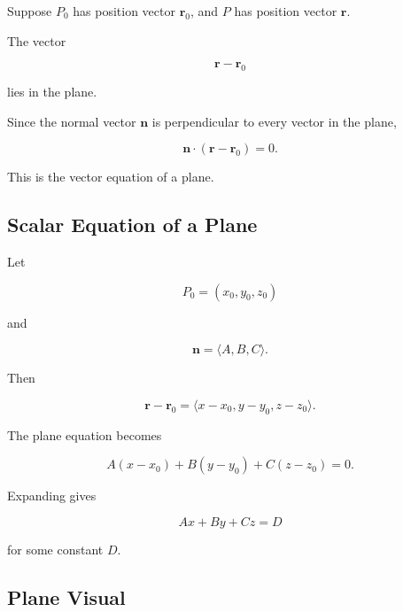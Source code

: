 Suppose \(P_0\) has position vector \(\mathbf{r}_0\), and \(P\) has position
vector \(\mathbf{r}\).

The vector

\[ \mathbf{r}-\mathbf{r}_0 \]

lies in the plane.

Since the normal vector \(\mathbf{n}\) is perpendicular to every vector in
the plane,

\[
\boxed{
\mathbf{n}\cdot(\mathbf{r}-\mathbf{r}_0)=0.
}
\]

This is the vector equation of a plane.

\subsection{Scalar Equation of a Plane}
\label{subsec:scalar-equation-plane}

Let

\[
P_0=(x_0,y_0,z_0)
\]

and

\[ \mathbf{n}=\langle A,B,C\rangle. \]

Then

\[
\mathbf{r}-\mathbf{r}_0
=
\langle
x-x_0,
y-y_0,
z-z_0
\rangle.
\]

The plane equation becomes

\[
\boxed{
A(x-x_0)+B(y-y_0)+C(z-z_0)=0.
}
\]

Expanding gives

\[ \boxed{Ax+By+Cz=D} \]

for some constant \(D\).

\subsection{Plane Visual}
\label{subsec:plane-normal-visual}

\begin{centereddiagram}
\end{centereddiagram}

